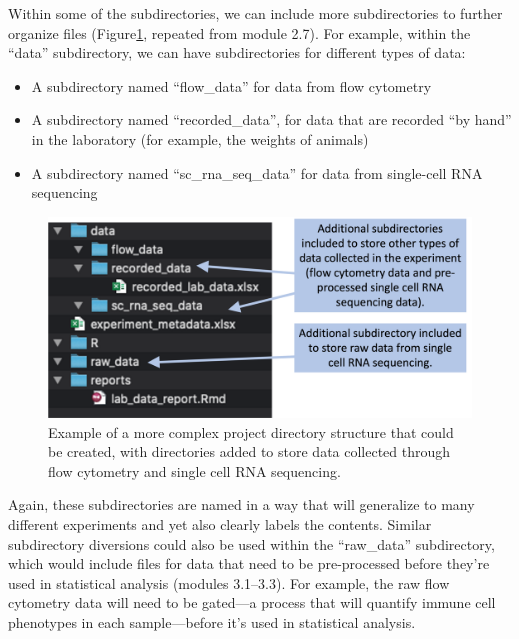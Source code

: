 \documentclass[]{tufte-book}
\providecommand{\tightlist}{%
  \setlength{\itemsep}{0pt}\setlength{\parskip}{0pt}}
\begin{document}
Within some of the subdirectories, we can include more subdirectories to further
organize files (Figure\ref{fig:projecttemplatecomplexmod8}, repeated from
module 2.7). For example, within the ``data'' subdirectory, we can have
subdirectories for different types of data:

\begin{itemize}
\tightlist
\item
  A subdirectory named ``flow\_data'' for data from flow cytometry
\item
  A subdirectory named ``recorded\_data'', for data that are recorded ``by hand''
  in the laboratory (for example, the weights of animals)
\item
  A subdirectory named ``sc\_rna\_seq\_data'' for data from single-cell RNA
  sequencing
\end{itemize}

\begin{figure}
\includegraphics[width=\textwidth]{figures/project_template_morecomplex} \caption[Example of a more complex project directory structure that could be created, with directories added to store data collected through flow cytometry and single cell RNA sequencing]{Example of a more complex project directory structure that could be created, with directories added to store data collected through flow cytometry and single cell RNA sequencing.}\label{fig:projecttemplatecomplexmod8}
\end{figure}

Again, these subdirectories are named in a way that will generalize to many
different experiments and yet also clearly labels the contents. Similar
subdirectory diversions could also be used within the ``raw\_data'' subdirectory,
which would include files for data that need to be pre-processed before
they're used in statistical analysis (modules 3.1--3.3). For example, the
raw flow cytometry data will need to be gated---a process that will quantify
immune cell phenotypes in each sample---before it's used in statistical
analysis.
\end{document}
